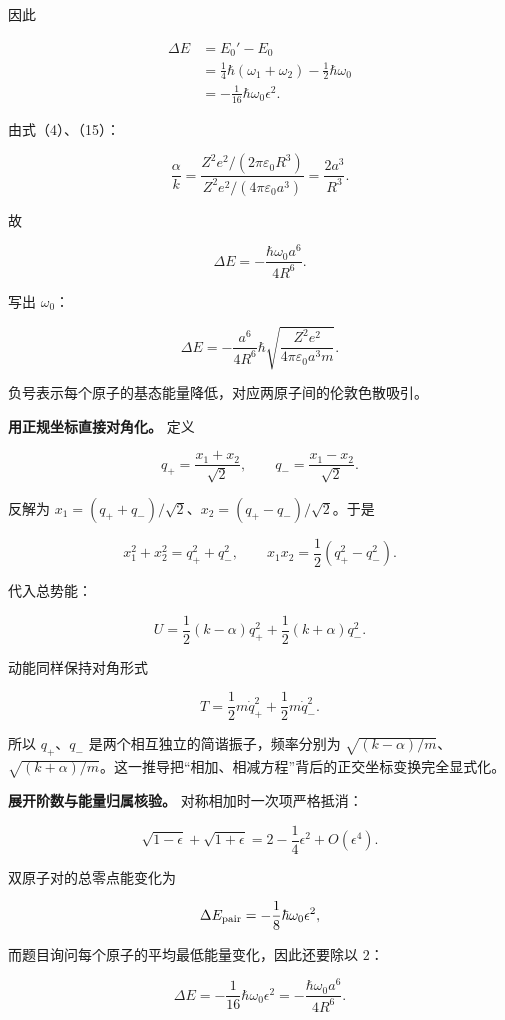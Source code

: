 \documentclass[12pt,a4paper,UTF8]{ctexart}
\begin{document}
因此

\[
\begin{aligned}
\Delta E
&=E_0'-E_0\\
&=\frac14\hbar(\omega_1+\omega_2)
-\frac12\hbar\omega_0\\
&=-\frac1{16}\hbar\omega_0\epsilon^2.
\end{aligned}
\tag{27}
\]

由式（4）、（15）：

\[
\frac{\alpha}{k}
=\frac{Z^2e^2/(2\pi\varepsilon_0R^3)}
{Z^2e^2/(4\pi\varepsilon_0a^3)}
=\frac{2a^3}{R^3}.
\tag{28}
\]

故

\[
\boxed{
\Delta E
=-\frac{\hbar\omega_0a^6}{4R^6}
}.
\tag{29}
\]

写出 \(\omega_0\)：

\[
\boxed{
\Delta E
=-\frac{a^6}{4R^6}\hbar
\sqrt{\frac{Z^2e^2}{4\pi\varepsilon_0a^3m}}
}.
\tag{30}
\]

负号表示每个原子的基态能量降低，对应两原子间的伦敦色散吸引。

\textbf{用正规坐标直接对角化。} 定义

\[
q_+=\frac{x_1+x_2}{\sqrt2},
\qquad
q_-=\frac{x_1-x_2}{\sqrt2}.
\]

反解为 \(x_1=(q_++q_-)/\sqrt2\)、\(x_2=(q_+-q_-)/\sqrt2\)。于是

\[
x_1^2+x_2^2=q_+^2+q_-^2,
\qquad
x_1x_2=\frac12(q_+^2-q_-^2).
\]

代入总势能：

\[
U=\frac12(k-\alpha)q_+^2
+\frac12(k+\alpha)q_-^2.
\]

动能同样保持对角形式

\[
T=\frac12m\dot q_+^2+\frac12m\dot q_-^2.
\]

所以 \(q_+\)、\(q_-\) 是两个相互独立的简谐振子，频率分别为
\(\sqrt{(k-\alpha)/m}\)、\(\sqrt{(k+\alpha)/m}\)。这一推导把``相加、相减方程''背后的正交坐标变换完全显式化。

\textbf{展开阶数与能量归属核验。} 对称相加时一次项严格抵消：

\[
\sqrt{1-\epsilon}+\sqrt{1+\epsilon}
=2-\frac14\epsilon^2+O(\epsilon^4).
\]

双原子对的总零点能变化为

\[
\Delta E_{\rm pair}
=-\frac18\hbar\omega_0\epsilon^2,
\]

而题目询问每个原子的平均最低能量变化，因此还要除以 \(2\)：

\[
\Delta E
=-\frac1{16}\hbar\omega_0\epsilon^2
=-\frac{\hbar\omega_0a^6}{4R^6}.
\]
\end{document}
